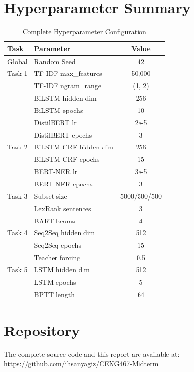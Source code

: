\documentclass[12pt, a4paper]{article}
\begin{document}
\appendix
\section{Hyperparameter Summary}

\begin{table}[H]
\centering
\caption{Complete Hyperparameter Configuration}
\label{tab:hyperparams}
\begin{tabular}{llc}
\toprule
\textbf{Task} & \textbf{Parameter} & \textbf{Value} \\
\midrule
Global & Random Seed & 42 \\
\midrule
Task 1 & TF-IDF max\_features & 50,000 \\
 & TF-IDF ngram\_range & (1, 2) \\
 & BiLSTM hidden dim & 256 \\
 & BiLSTM epochs & 10 \\
 & DistilBERT lr & 2e-5 \\
 & DistilBERT epochs & 3 \\
\midrule
Task 2 & BiLSTM-CRF hidden dim & 256 \\
 & BiLSTM-CRF epochs & 15 \\
 & BERT-NER lr & 3e-5 \\
 & BERT-NER epochs & 3 \\
\midrule
Task 3 & Subset size & 5000/500/500 \\
 & LexRank sentences & 3 \\
 & BART beams & 4 \\
\midrule
Task 4 & Seq2Seq hidden dim & 512 \\
 & Seq2Seq epochs & 15 \\
 & Teacher forcing & 0.5 \\
\midrule
Task 5 & LSTM hidden dim & 512 \\
 & LSTM epochs & 5 \\
 & BPTT length & 64 \\
\bottomrule
\end{tabular}
\end{table}

\section{Repository}

The complete source code and this report are available at:\\
\url{https://github.com/ihsanyagiz/CENG467-Midterm}
\end{document}
